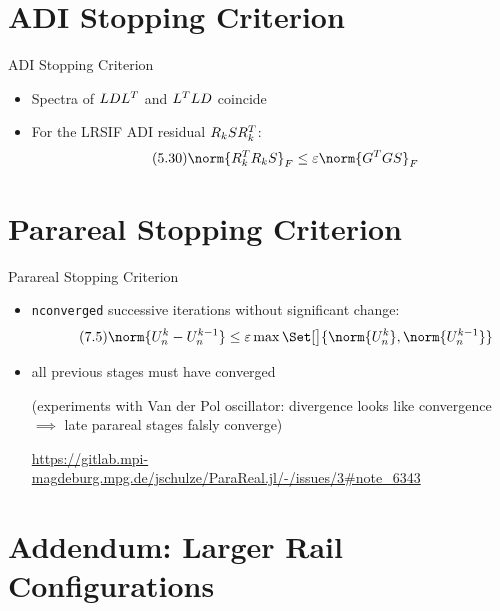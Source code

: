 \section{ADI Stopping Criterion}

\begin{frame}{ADI Stopping Criterion}
  \begin{itemize}
    \item
      Spectra of $LDL^T$ and $L^T LD$ coincide
    \item
      For the LRSIF ADI residual $R_k S R_k^T$:
      \begin{equation}
        \tag{5.30}
        \norm{R_k^\T R_k S}_F
        \leq\epsilon \norm{G^\T G S}_F
      \end{equation}
  \end{itemize}
\end{frame}

\section{Parareal Stopping Criterion}

\begin{frame}{Parareal Stopping Criterion}
  \begin{itemize}
    \item
      \texttt{nconverged} successive iterations without significant change:
      \begin{equation}
        \tag{7.5}
        \norm{U_n^k - U_n^{k-1}} \leq \epsilon\max\Set[\big]{
        \norm{U_n^k}, \norm{U_n^{k-1}}
        }
      \end{equation}
    \item
      all previous stages must have converged

      (experiments with Van der Pol oscillator: divergence looks like convergence $\implies$ late parareal stages falsly converge)

      \url{https://gitlab.mpi-magdeburg.mpg.de/jschulze/ParaReal.jl/-/issues/3\#note_6343}
  \end{itemize}
\end{frame}

\section{Addendum: Larger Rail Configurations}
\label{app:rail1357}

